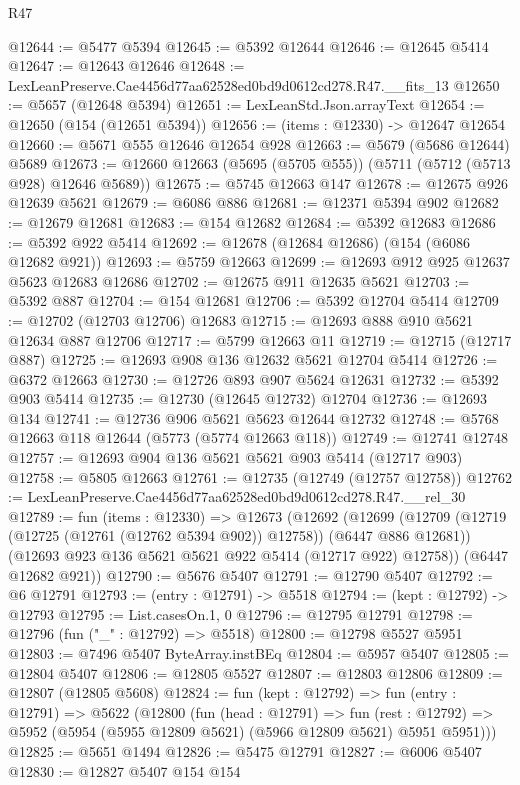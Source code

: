 \begin{lexlean}{R47}
\begin{coremodule}
@12644 := @5477 @5394
@12645 := @5392 @12644
@12646 := @12645 @5414
@12647 := @12643 @12646
@12648 := LexLeanPreserve.Cae4456d77aa62528ed0bd9d0612cd278.R47.__fits_13
@12650 := @5657 (@12648 @5394)
@12651 := LexLeanStd.Json.arrayText
@12654 := @12650 (@154 (@12651 @5394))
@12656 := (items : @12330) -> @12647 @12654
@12660 := @5671 @555 @12646 @12654 @928
@12663 := @5679 (@5686 @12644) @5689
@12673 := @12660 @12663 (@5695 (@5705 @555)) (@5711 (@5712 (@5713 @928) @12646 @5689))
@12675 := @5745 @12663 @147
@12678 := @12675 @926 @12639 @5621
@12679 := @6086 @886
@12681 := @12371 @5394 @902
@12682 := @12679 @12681
@12683 := @154 @12682
@12684 := @5392 @12683
@12686 := @5392 @922 @5414
@12692 := @12678 (@12684 @12686) (@154 (@6086 @12682 @921))
@12693 := @5759 @12663
@12699 := @12693 @912 @925 @12637 @5623 @12683 @12686
@12702 := @12675 @911 @12635 @5621
@12703 := @5392 @887
@12704 := @154 @12681
@12706 := @5392 @12704 @5414
@12709 := @12702 (@12703 @12706) @12683
@12715 := @12693 @888 @910 @5621 @12634 @887 @12706
@12717 := @5799 @12663 @11
@12719 := @12715 (@12717 @887)
@12725 := @12693 @908 @136 @12632 @5621 @12704 @5414
@12726 := @6372 @12663
@12730 := @12726 @893 @907 @5624 @12631
@12732 := @5392 @903 @5414
@12735 := @12730 (@12645 @12732) @12704
@12736 := @12693 @134
@12741 := @12736 @906 @5621 @5623 @12644 @12732
@12748 := @5768 @12663 @118 @12644 (@5773 (@5774 @12663 @118))
@12749 := @12741 @12748
@12757 := @12693 @904 @136 @5621 @5621 @903 @5414 (@12717 @903)
@12758 := @5805 @12663
@12761 := @12735 (@12749 (@12757 @12758))
@12762 := LexLeanPreserve.Cae4456d77aa62528ed0bd9d0612cd278.R47.__rel_30
@12789 := fun (items : @12330) =>
  @12673
    (@12692
      (@12699
        (@12709 (@12719 (@12725 (@12761 (@12762 @5394 @902)) @12758)) (@6447 @886 @12681))
        (@12693 @923 @136 @5621 @5621 @922 @5414 (@12717 @922) @12758))
      (@6447 @12682 @921))
@12790 := @5676 @5407
@12791 := @12790 @5407
@12792 := @6 @12791
@12793 := (entry : @12791) -> @5518
@12794 := (kept : @12792) -> @12793
@12795 := List.casesOn.{1, 0}
@12796 := @12795 @12791
@12798 := @12796 (fun ("_" : @12792) => @5518)
@12800 := @12798 @5527 @5951
@12803 := @7496 @5407 ByteArray.instBEq
@12804 := @5957 @5407
@12805 := @12804 @5407
@12806 := @12805 @5527
@12807 := @12803 @12806
@12809 := @12807 (@12805 @5608)
@12824 := fun (kept : @12792) =>
  fun (entry : @12791) =>
  @5622
    (@12800
      (fun (head : @12791) =>
      fun (rest : @12792) => @5952 (@5954 (@5955 @12809 @5621) (@5966 @12809 @5621) @5951 @5951)))
@12825 := @5651 @1494
@12826 := @5475 @12791
@12827 := @6006 @5407
@12830 := @12827 @5407 @154 @154

\end{coremodule}
\end{lexlean}
